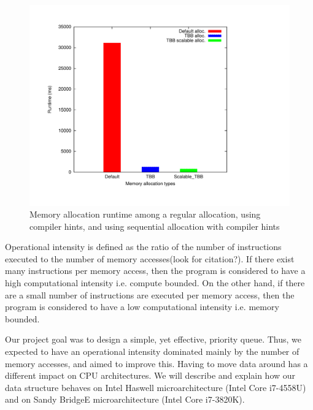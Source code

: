 \begin{figure}
	\centering
  	\includegraphics[scale=0.3]{../plots/mem_alloc/mem_alloc.pdf}
	\caption{Memory allocation runtime among a regular allocation, using compiler hints, and using sequential allocation with compiler hints}
	\label{fig:mem_alloc}
\end{figure}


Operational intensity is defined as the ratio of the number of instructions executed to the number of memory accesses(look for citation?). If there exist many instructions per memory access, then the program is considered to have a high computational intensity i.e. compute bounded. On the other hand, if there are a small number of instructions are executed per memory access, then the program is considered to have a low computational intensity i.e. memory bounded.

Our project goal was to design a simple, yet effective, priority queue. Thus, we expected to have an operational intensity dominated mainly by the number of memory accesses, and aimed to improve this. Having to move data around has a different impact on CPU architectures. We will describe and explain how our data structure behaves on Intel Haswell microarchitecture (Intel Core i7-4558U) and on Sandy BridgeE microarchitecture (Intel Core i7-3820K). 

